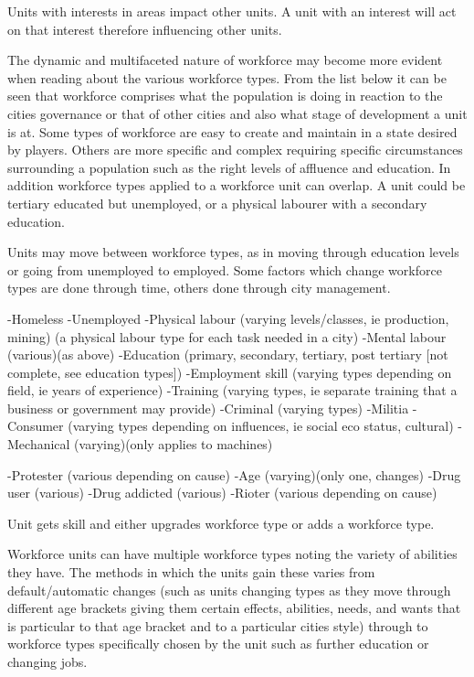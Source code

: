 Units with interests in areas impact other units.
A unit with an interest will act on that interest therefore influencing other units.



The dynamic and multifaceted nature of workforce may become more evident when reading about the various workforce types. From the list below it can be seen that workforce comprises what the population is doing in reaction to the cities governance or that of other cities and also what stage of development a unit is at. Some types of workforce are easy to create and maintain in a state desired by players. Others are more specific and complex requiring specific circumstances surrounding a population such as the right levels of affluence and education. In addition workforce types applied to a workforce unit can overlap. A unit could be tertiary educated but unemployed, or a physical labourer with a secondary education. 

Units may move between workforce types, as in moving through education levels or going from unemployed to employed. Some factors which change workforce types are done through time, others done through city management.


-Homeless
-Unemployed
-Physical labour (varying levels/classes, ie production, mining)
	(a physical labour type for each task needed in a city) 
-Mental labour (various)(as above)
-Education (primary, secondary, tertiary, post tertiary [not complete, see education types])
-Employment skill (varying types depending on field, ie years of experience)
-Training (varying types, ie separate training that a business or government may provide)
-Criminal (varying types)
-Militia
-Consumer (varying types depending on influences, ie social eco status, cultural)
-Mechanical (varying)(only applies to machines)

-Protester (various depending on cause)
-Age (varying)(only one, changes)
-Drug user (various)
-Drug addicted (various)
-Rioter (various depending on cause)



Unit gets skill and either upgrades workforce type or adds a workforce type.

Workforce units can have multiple workforce types noting the variety of abilities they have. The methods in which the units gain these varies from default/automatic changes (such as units changing types as they move through different age brackets giving them certain effects, abilities, needs, and wants that is particular to that age bracket and to a particular cities style) through to workforce types specifically chosen by the unit such as further education or changing jobs. 

